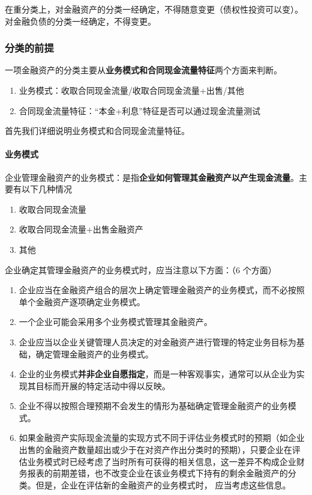 \documentclass[UTF8,12pt]{ctexart}
\numberwithin{equation}{section} %
\numberwithin{figure}{section}
\numberwithin{table}{section}
\begin{document}
	在重分类上，对金融资产的分类一经确定，不得随意变更（债权性投资可以变）。对金融负债的分类一经确定，不得变更。
	
	\subsubsection{分类的前提}
	一项金融资产的分类主要从\textbf{业务模式和合同现金流量特征}两个方面来判断。
	\begin{enumerate}
		\item 业务模式：收取合同现金流量/收取合同现金流量+出售/其他
		
		\item 合同现金流量特征：“本金+利息”特征是否可以通过现金流量测试
	\end{enumerate}
	
	首先我们详细说明业务模式和合同现金流量特征。
	
	\paragraph{业务模式}
	
	企业管理金融资产的业务模式：是指\textbf{企业如何管理其金融资产以产生现金流量}。主要有以下几种情况
	\begin{enumerate}
		\item 收取合同现金流量
		
		\item 收取合同现金流量+出售金融资产
		
		\item 其他
	\end{enumerate}
	
	企业确定其管理金融资产的业务模式时，应当注意以下方面：（6 个方面）
	\begin{enumerate}
		\item 企业应当在金融资产组合的层次上确定管理金融资产的业务模式，而不必按照单个金融资产逐项确定业务模式。
		
		\item 一个企业可能会采用多个业务模式管理其金融资产。
		
		\item 企业应当以企业关键管理人员决定的对金融资产进行管理的特定业务目标为基础，确定管理金融资产的业务模式。
		
		\item 企业的业务模式\textbf{并非企业自愿指定}，而是一种客观事实，通常可以从企业为实现其目标而开展的特定活动中得以反映。
		
		\item 企业不得以按照合理预期不会发生的情形为基础确定管理金融资产的业务模式。
		
		\item 如果金融资产实际现金流量的实现方式不同于评估业务模式时的预期（如企业出售的金融资产数量超出或少于在对资产作出分类时的预期），只要企业在评估业务模式时已经考虑了当时所有可获得的相关信息，这一差异不构成企业财务报表的前期差错，也不改变企业在该业务模式下持有的剩余金融资产的分类。但是，企业在评估新的金融资产的业务模式时， 应当考虑这些信息。
	\end{enumerate}
	
\end{document}
